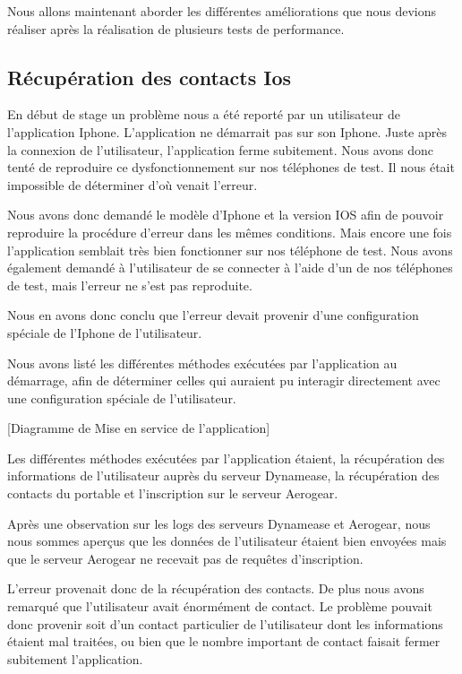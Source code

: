 Nous allons maintenant aborder les différentes améliorations que nous devions réaliser après la réalisation de plusieurs tests de performance.

\subsection{Récupération des contacts Ios}

En début de stage un problème nous a été reporté par un utilisateur de l'application Iphone. L'application ne démarrait pas sur son Iphone. Juste après la connexion de l'utilisateur, l'application ferme subitement. Nous avons donc tenté de reproduire ce dysfonctionnement sur nos téléphones de test. Il nous était impossible de déterminer d'où venait l'erreur.

Nous avons donc demandé le modèle d'Iphone et la version IOS afin de pouvoir reproduire la procédure d'erreur dans les mêmes conditions. Mais encore une fois l'application semblait très bien fonctionner sur nos téléphone de test. Nous avons également demandé à l'utilisateur de se connecter à l'aide d'un de nos téléphones de test, mais l'erreur ne s'est pas reproduite.

Nous en avons donc conclu que l'erreur devait provenir d'une configuration spéciale de l'Iphone de l'utilisateur.

Nous avons listé les différentes méthodes exécutées par l'application au démarrage, afin de déterminer celles qui auraient pu interagir directement avec une configuration spéciale de l'utilisateur.

[Diagramme de Mise en service de l'application]

Les différentes méthodes exécutées par l'application étaient, la récupération des informations de l'utilisateur auprès du serveur Dynamease, la récupération des contacts du portable et l'inscription sur le serveur Aerogear.

Après une observation sur les logs des serveurs Dynamease et Aerogear, nous nous sommes aperçus que les données de l'utilisateur étaient bien envoyées mais que le serveur Aerogear ne recevait pas de requêtes d'inscription.

L'erreur provenait donc de la récupération des contacts. De plus nous avons remarqué que l'utilisateur avait énormément de contact. Le problème pouvait donc provenir soit d'un contact particulier de l'utilisateur dont les informations étaient mal traitées, ou bien que le nombre important de contact faisait fermer subitement l'application.

